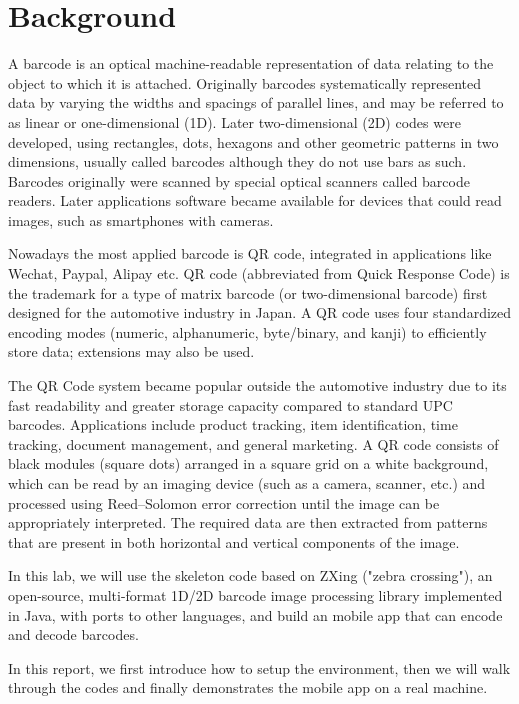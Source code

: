 \section{Background}

A barcode is an optical machine-readable representation of data relating to the object
to which it is attached. Originally barcodes systematically represented data by varying the
widths and spacings of parallel lines, and may be referred to as linear or one-dimensional
(1D). Later two-dimensional (2D) codes were developed, using rectangles, dots, hexagons
and other geometric patterns in two dimensions, usually called barcodes although they do
not use bars as such. Barcodes originally were scanned by special optical scanners called
barcode readers. Later applications software became available for devices that could read
images, such as smartphones with cameras.


Nowadays the most applied barcode is QR code, integrated in applications like
Wechat, Paypal, Alipay etc. QR code (abbreviated from Quick Response Code) is the
trademark for a type of matrix barcode (or two-dimensional barcode) first designed for the
automotive industry in Japan. A QR code uses four standardized encoding modes
(numeric, alphanumeric, byte/binary, and kanji) to efficiently store data; extensions may
also be used.


The QR Code system became popular outside the automotive industry due
to its fast readability and greater storage capacity compared to standard UPC barcodes.
Applications include product tracking, item identification, time tracking, document
management, and general marketing.
A QR code consists of black modules (square dots)
arranged in a square grid on a white background, which can be read by an imaging
device (such as a camera, scanner, etc.) and processed using Reed–Solomon error
correction until the image can be appropriately interpreted. The required data are then
extracted from patterns that are present in both horizontal and vertical components of the
image.

In this lab, we will use the skeleton code based on ZXing ("zebra crossing"), an open-source, multi-format 1D/2D barcode image processing library implemented in Java, with ports to other languages, and build an mobile app that can encode and decode barcodes.

In this report, we first introduce how to setup the environment, then we will walk through the codes and finally demonstrates the mobile app on a real machine.

